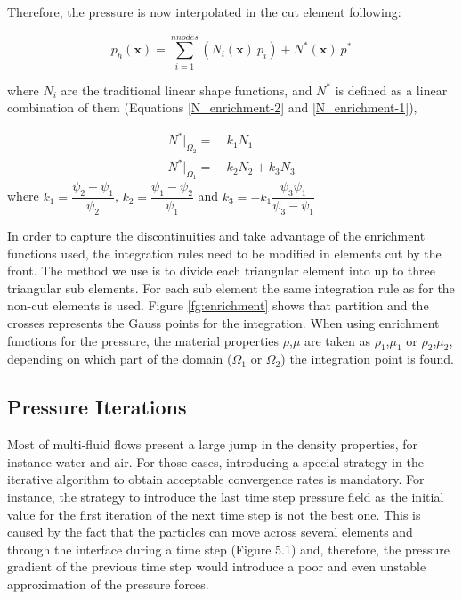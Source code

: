 \documentclass[a4paper,conference]{IEEEtran}
\newcommand{\xx}{\mathbf{x}}
\begin{document}
   Therefore, the pressure is now interpolated in the cut element following:

   \begin{equation}
      p_h(\xx) = \sum_{i=1}^{nnodes} (N_i(\xx) \ p_i) + N^*(\xx) \ p^*
   \end{equation}

   where $N_i$ are the traditional linear shape functions, and $N^*$ is defined as a linear combination of them (Equations \ref{N_enrichment-2} and \ref{N_enrichment-1}),

   \begin{align}
    N^*|_{\Omega_2} = & \ k_1 N_1 \label{N_enrichment-2}\\
    N^*|_{\Omega_1} = & \ k_2 N_2 + k_3 N_3 \label{N_enrichment-1}
   \end{align}
   where $k_1 = \dfrac{\psi_2-\psi_1}{\psi_2}$, $k_2 = \dfrac{\psi_1-\psi_2}{\psi_1}$ and $k_3 = -k_1\dfrac{\psi_3\psi_1}{\psi_3-\psi_1}$
	
	
   In order to capture the discontinuities and take advantage of the enrichment functions used, the integration rules need to be modified in elements cut by the front. The method we use is to divide each triangular element into up to three triangular sub elements. For each sub element the same integration rule as for the non-cut elements is used. Figure \ref{fg:enrichment}  shows that partition and the crosses represents the Gauss points for the integration. When using enrichment functions for the pressure, the material properties $\rho$,$\mu$ are taken as $\rho_1$,$\mu_1$ or $\rho_2$,$\mu_2$, depending on which part of the domain ($\Omega_1$ or $\Omega_2$) the integration point is found.

   \subsection{Pressure Iterations}

Most of multi-fluid flows present a large jump in the density properties, for instance water and air. For those cases, introducing a special strategy in the iterative algorithm to obtain acceptable convergence rates is mandatory. For instance, the strategy to introduce the last time step pressure field as the initial value for the first iteration of the next time step is not the best one. This is caused by the fact that the particles can move across several elements and through the interface during a time step (Figure 5.1) and, therefore, the pressure gradient of the previous time step would introduce a poor and even unstable approximation of the pressure forces.
\end{document}
